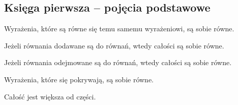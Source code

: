 \subsection{Księga pierwsza -- pojęcia podstawowe}
\setcounter{counter_euclid}{0}
\begin{euclid_basic}
Wyrażenia, które są równe się temu samemu wyrażeniowi, są sobie równe.
\end{euclid_basic}

\begin{euclid_basic}
Jeżeli równania dodawane są do równań, wtedy całości są sobie równe.
\end{euclid_basic}

\begin{euclid_basic}
Jeżeli równania odejmowane są do równań, wtedy całości są sobie równe.
\end{euclid_basic}

\begin{euclid_basic}
Wyrażenia, które się pokrywają, są sobie równe.
\end{euclid_basic}

\begin{euclid_basic}
Całość jest większa od części. 
\end{euclid_basic}
